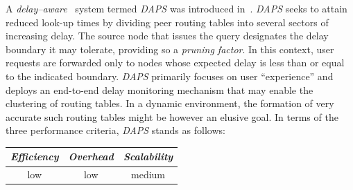 A \emph{delay--aware} \p\ system termed {\sl DAPS} 
was introduced in~\cite{ZL2005}.
{\sl DAPS}  seeks to attain reduced look-up times by dividing 
peer routing tables into several sectors of increasing delay. 
The source node that issues the query designates the delay 
boundary it may tolerate, providing so a \emph{pruning factor}.
In this context, user requests are forwarded only to 
nodes whose expected delay is less than or equal to the indicated boundary. 
{\sl DAPS} primarily focuses on user ``experience'' and deploys an
end-to-end delay monitoring mechanism that may enable
the clustering of routing tables. 
In a dynamic environment, the formation 
of very accurate such routing tables might be however an elusive goal.
In terms of the three performance criteria, {\sl DAPS} stands as follows:
\begin{center}
{\footnotesize
\begin{tabular}{ccc}
\emph{Efficiency} & \emph{Overhead} & \emph{Scalability} \\
\hline
low &
low &
%
medium
\end{tabular}
}
\end{center}


